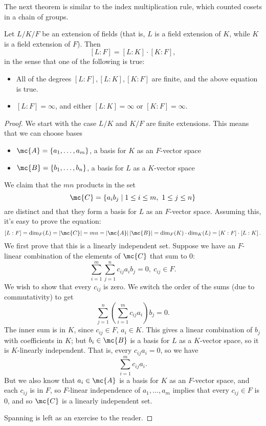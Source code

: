 \documentclass[math1530-lecture-notes]{subfiles}
\begin{document}
The next theorem is similar to the index multiplication rule, which counted cosets in a chain of
groups.
\begin{theorem}{}
  Let $L / K / F$ be an extension of fields (that is, $L$ is a field extension of $K$, while $K$ is
  a field extension of $F$). Then \[
    \left[ L : F \right] = \left[ L : K \right] \cdot \left[ K : F \right] 
  ,\] in the sense that one of the following is true:
  \begin{itemize}
    \item All of the degrees $\left[ L : F \right], \left[L : K\right], \left[K : F\right]$ are
      finite, and the above equation is true.
    \item $\left[L : F\right]=\infty$, and either $\left[L : K\right]=\infty$ or $\left[K :
      F\right]=\infty$.
  \end{itemize}
\end{theorem}
\begin{proof}[Proof]
  We start with the case $L / K$ and $K / F$ are finite extensions. This means that we can choose
  bases 
  \begin{itemize}
    \item $\mc{A}=\{ a_1,\ldots,a_m \}$, a basis for $K$ as an $F$-vector space
    \item $\mc{B}=\{ b_1,\ldots,b_n \}$, a basis for $L$ as a $K$-vector space
  \end{itemize}

  We claim that the $mn$ products in the set \[
    \mc{C} = \{a_ib_j\mid 1\le i\le m,\ 1\le j\le n\} 
  \] are distinct and that they form a basis for $L$ as an $F$-vector space. Assuming this, it's
  easy to prove the equation: \[
    \left[L : F\right]=\dim_F(L)=\left| \mc{C} \right| =mn=\left| \mc{A} \right| \left| \mc{B}
    \right| =\dim_F(K)\cdot \dim_K(L)=\left[K : F\right]\cdot \left[L : K\right]
  .\] We first prove that this is a linearly independent set. Suppose we have an $F$-linear
  combination of the elements of $\mc{C}$ that sum to $0$: \[
    \sum_{i=1}^{m} \sum_{j=1}^{n} c_{ij}a_ib_j=0,\ c_{ij}\in F
  .\] We wish to show that every $c_{ij}$ is zero. We switch the order of the sums (due to
  commutativity) to get \[
    \sum_{j=1}^{n} \left( \sum_{i=1}^{m} c_{ij}a_i \right) b_j=0
  .\] The inner sum is in $K$, since $c_{ij}\in F$, $a_i\in K$. This gives a linear combination of
  $b_j$ with coefficients in $K$; but $b_i\in \mc{B}$ is a basis for $L$ as a $K$-vector space, so
  it is $K$-linearly independent. That is, every $c_{ij}a_i=0$, so we have \[
    \sum_{i=1}^{m} c_{ij}a_i
  .\] But we also know that $a_i\in \mc{A}$ is a basis for $K$ as an $F$-vector space, and each
  $c_{ij}$ is in $F$, so $F$-linear independence of $a_1,\ldots,a_m$ implies that every $c_{ij}\in
  F$ is $0$, and so $\mc{C}$ is a linearly independent set.

  Spanning is left as an exercise to the reader.
\end{proof}
\end{document}
